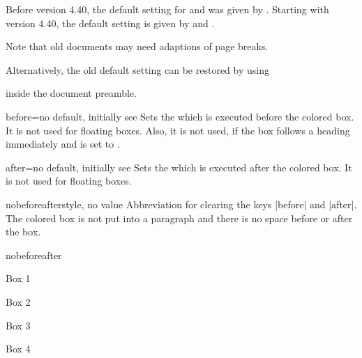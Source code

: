 \begin{marker}
Before version 4.40, the default setting for 
and  was given by .
Starting with version 4.40, the default setting is given by
 and .\par
Note that old documents may need adaptions of page breaks.\par
Alternatively, the old default setting can be restored by using
\begin{dispListing}
\end{dispListing}
inside the document preamble.
\end{marker}


\begin{docTcbKey}{before}{=}{no default, initially see }
  Sets the  which is executed before the colored box.
  It is not used for floating boxes.
  Also, it is not used, if the box follows a heading immediately
  and  is set to .
\end{docTcbKey}

\begin{docTcbKey}{after}{=}{no default, initially see }
  Sets the  which is executed after the colored box.
  It is not used for floating boxes.
\end{docTcbKey}


\begin{docTcbKey}{nobeforeafter}{}{style, no value}
  Abbreviation for clearing the keys |before| and |after|. The colored box
  is not put into a paragraph and there is no space before or after the box.
\begin{exdispExample}{nobeforeafter}
\begin{tcolorbox}[myone,title=Box 1]Box 1\end{tcolorbox}%
\begin{tcolorbox}[myone,title=Box 2]Box 2\end{tcolorbox}%
\begin{tcolorbox}[myone,title=Box 3]Box 3\end{tcolorbox}%
\begin{tcolorbox}[myone,title=Box 4]Box 4\end{tcolorbox}
\end{exdispExample}
\end{docTcbKey}

